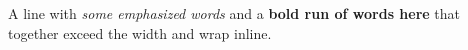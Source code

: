 A line with \emph{some emphasized words} and a \textbf{bold run of words here} that together exceed the width and wrap inline.
